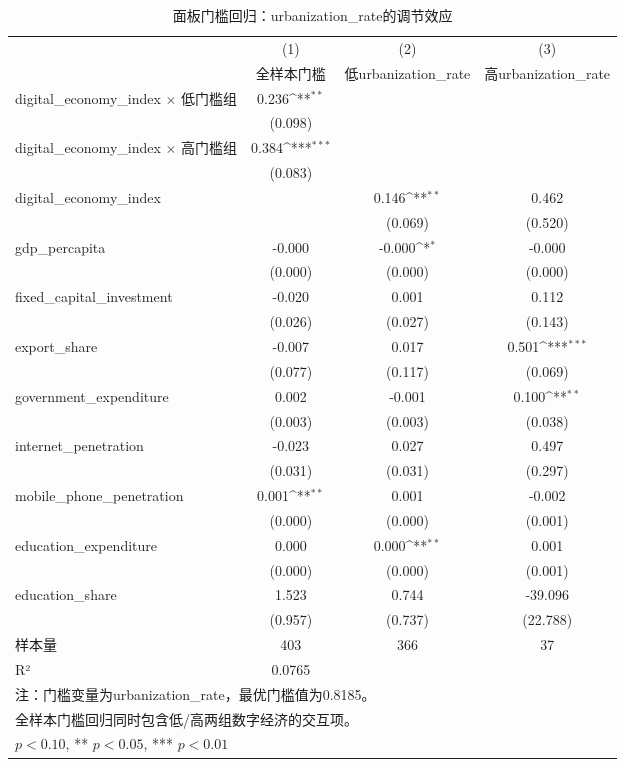 \begin{table}[htbp]
\centering
\caption{面板门槛回归：urbanization\_rate的调节效应\label{tab:threshold}}
\def\sym#1{\ifmmode^{#1}\else\(^{#1}\)\fi}
\begin{tabular}{l*{3}{c}}
\toprule
& \multicolumn{1}{c}{(1)} & \multicolumn{1}{c}{(2)} & \multicolumn{1}{c}{(3)} \\
& \multicolumn{1}{c}{全样本门槛} & \multicolumn{1}{c}{低urbanization\_rate} & \multicolumn{1}{c}{高urbanization\_rate} \\
\midrule
digital\_economy\_index $\times$ 低门槛组 & 0.236\sym{**} &  &  \\
  & (0.098) &  &  \\
\addlinespace
digital\_economy\_index $\times$ 高门槛组 & 0.384\sym{***} &  &  \\
  & (0.083) &  &  \\
\addlinespace
digital\_economy\_index &  & 0.146\sym{**} & 0.462 \\
  &  & (0.069) & (0.520) \\
\addlinespace
gdp\_percapita & -0.000 & -0.000\sym{*} & -0.000 \\
  & (0.000) & (0.000) & (0.000) \xed\_capital\_investment & -0.020 & 0.001 & 0.112 \\
  & (0.026) & (0.027) & (0.143) \\
export\_share & -0.007 & 0.017 & 0.501\sym{***} \\
  & (0.077) & (0.117) & (0.069) \\
government\_expenditure & 0.002 & -0.001 & 0.100\sym{**} \\
  & (0.003) & (0.003) & (0.038) \\
internet\_penetration & -0.023 & 0.027 & 0.497 \\
  & (0.031) & (0.031) & (0.297) \\
mobile\_phone\_penetration & 0.001\sym{**} & 0.001 & -0.002 \\
  & (0.000) & (0.000) & (0.001) \\
education\_expenditure & 0.000 & 0.000\sym{**} & 0.001 \\
  & (0.000) & (0.000) & (0.001) \\
education\_share & 1.523 & 0.744 & -39.096 \\
  & (0.957) & (0.737) & (22.788) \\
\midrule
样本量 & 403 & 366 & 37 \\
R² & 0.0765 & & \\
\bottomrule
\multicolumn{4}{l}{\footnotesize 注：门槛变量为urbanization\_rate，最优门槛值为0.8185。}\\
\multicolumn{4}{l}{\footnotesize 全样本门槛回归同时包含低/高两组数字经济的交互项。}\\
\multicolumn{4}{l}{\footnotesize * $p<0.10$, ** $p<0.05$, *** $p<0.01$}\\
\end{tabular}
\end{table}